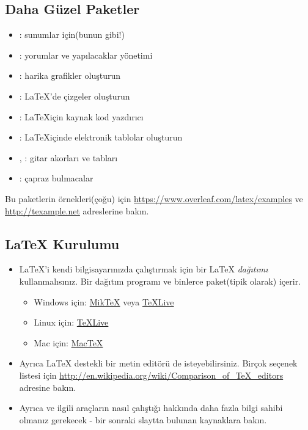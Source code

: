 \documentclass[aspectratio=169]{beamer}
\begin{document}
\subsection{Daha Güzel Paketler}
\begin{frame}{\insertsubsection}
\begin{itemize}
\item {}: sunumlar için(bunun gibi!)
\item {}: yorumlar ve yapılacaklar yönetimi
\item {}: harika grafikler oluşturun
\item {}: \LaTeX'de çizgeler oluşturun
\item {}: \LaTeX için kaynak kod yazdırıcı
\item {}: \LaTeX içinde elektronik tablolar oluşturun
\item {}, : gitar akorları ve tabları
\item {}: çapraz bulmacalar
\end{itemize}
Bu paketlerin örnekleri(çoğu) için \url{https://www.overleaf.com/latex/examples} ve \url{http://texample.net} adreslerine bakın.
\end{frame}

\subsection{\LaTeX{} Kurulumu}
\begin{frame}{\insertsubsection}
\begin{itemize}
\item \LaTeX{}'i kendi bilgisayarınızda çalıştırmak için bir \LaTeX{}
\emph{dağıtımı} kullanmalısınız. Bir dağıtım  programı ve binlerce paket(tipik olarak) içerir.

\begin{itemize}
\item Windows için: \href{http://miktex.org/}{Mik\TeX} veya \href{http://tug.org/texlive/}{\TeX Live}
\item Linux için: \href{http://tug.org/texlive/}{\TeX Live}
\item Mac için: \href{http://tug.org/mactex/}{Mac\TeX}
\end{itemize}
\item Ayrıca \LaTeX{} destekli bir metin editörü de isteyebilirsiniz. Birçok seçenek listesi için \url{http://en.wikipedia.org/wiki/Comparison_of_TeX_editors} adresine bakın.
\item Ayrıca  ve ilgili araçların nasıl çalıştığı hakkında daha fazla bilgi sahibi olmanız gerekecek - bir sonraki slaytta bulunan kaynaklara bakın.
\end{itemize}
\end{frame}
\end{document}
